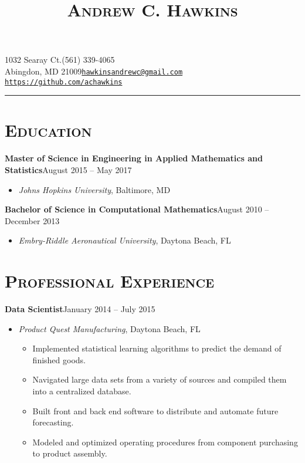 \documentclass[10pt]{article}
\title{\textsc{\textbf{Andrew C. Hawkins}}\vspace{-13.7ex}}
\date{}
\author{}
\begin{document}
\maketitle

\section*{}
1032 Searay Ct.\hfill (561) 339-4065\\
Abingdon, MD 21009\hfill \texttt{\href{mailto:hawkinsandrewc@gmail.com}{hawkinsandrewc@gmail.com}}\\
\hspace*{\fill} \texttt{\url{https://github.com/achawkins}}

\noindent\rule{\textwidth}{1pt}

\section*{\textsc{Education}}
\textbf{Master of Science in Engineering in Applied Mathematics and Statistics}\hfill August 2015 -- May 2017
\begin{itemize}[noitemsep]
    \item[] \textit{Johns Hopkins University}, Baltimore, MD
\end{itemize}
\vspace{2ex}
\textbf{Bachelor of Science in Computational Mathematics}\hfill August 2010 -- December 2013
\begin{itemize}[noitemsep]
    \item[] \textit{Embry-Riddle Aeronautical University}, Daytona Beach, FL
\end{itemize}

\section*{\textsc{Professional Experience}}
\textbf{Data Scientist}\hfill January 2014 -- July 2015
\begin{itemize}[noitemsep]
    \item[] \textit{Product Quest Manufacturing}, Daytona Beach, FL
    \begin{itemize}[noitemsep]
        \item Implemented statistical learning algorithms to predict the demand of finished goods.
        \item Navigated large data sets from a variety of sources and compiled them into a centralized database.
        \item Built front and back end software to distribute and automate future forecasting.
        \item Modeled and optimized operating procedures from component purchasing to product assembly.
    \end{itemize}
\end{itemize}
\end{document}
